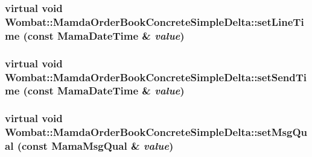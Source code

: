 \hypertarget{classWombat_1_1MamdaOrderBookConcreteSimpleDelta_02b30e502b29c88d9a228637dbc14599}{
\subsubsection[setLineTime]{\setlength{\rightskip}{0pt plus 5cm}virtual void Wombat::Mamda\-Order\-Book\-Concrete\-Simple\-Delta::set\-Line\-Time (const Mama\-Date\-Time \& {\em value})}}
\label{classWombat_1_1MamdaOrderBookConcreteSimpleDelta_02b30e502b29c88d9a228637dbc14599}


\hypertarget{classWombat_1_1MamdaOrderBookConcreteSimpleDelta_0ea5074d69173dab3523d7c7c98393f5}{
\subsubsection[setSendTime]{\setlength{\rightskip}{0pt plus 5cm}virtual void Wombat::Mamda\-Order\-Book\-Concrete\-Simple\-Delta::set\-Send\-Time (const Mama\-Date\-Time \& {\em value})}}
\label{classWombat_1_1MamdaOrderBookConcreteSimpleDelta_0ea5074d69173dab3523d7c7c98393f5}


\hypertarget{classWombat_1_1MamdaOrderBookConcreteSimpleDelta_8398a7c166767ce3832c1398a8809da7}{
\subsubsection[setMsgQual]{\setlength{\rightskip}{0pt plus 5cm}virtual void Wombat::Mamda\-Order\-Book\-Concrete\-Simple\-Delta::set\-Msg\-Qual (const Mama\-Msg\-Qual \& {\em value})}}
\label{classWombat_1_1MamdaOrderBookConcreteSimpleDelta_8398a7c166767ce3832c1398a8809da7}


